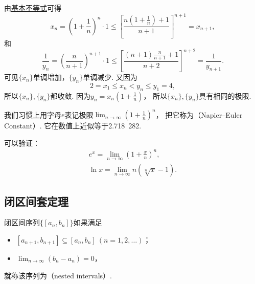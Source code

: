 由\hyperref[theorem:不等式.基本不等式n几何平均数与算术平均数]{基本不等式}可得\begin{equation*}
	x_n = \left(1+\frac1n\right)^n \cdot 1
	\leq \left[\frac{n\left(1+\frac1n\right)+1}{n+1}\right]^{n+1} = x_{n+1},
\end{equation*}
和\begin{equation*}
	\frac1{y_n} = \left(\frac{n}{n+1}\right)^{n+1} \cdot 1
	\leq \left[\frac{(n+1)\frac{n}{n+1}+1}{n+2}\right]^{n+2} = \frac1{y_{n+1}}.
\end{equation*}
可见\(\{x_n\}\)单调增加，\(\{y_n\}\)单调减少.
又因为\begin{equation*}
	2 = x_1 \leq x_n < y_n \leq y_1 = 4,
\end{equation*}
所以\(\{x_n\},\{y_n\}\)都收敛.
因为\(y_n=x_n\left(1+\frac1n\right)\)，
所以\(\{x_n\},\{y_n\}\)具有相同的极限.

我们习惯上用字母\(e\)表记极限\(\lim_{n\to\infty} \left(1+\frac1n\right)^n\)，
把它称为（Napier--Euler Constant）.
它在数值上近似等于{2.718~282}.

可以验证：\begin{gather}
	e^x = \lim_{n\to\infty} \left(1+\frac{x}{n}\right)^n,
	\label{equation:特殊函数.以e为底的指数函数} \\
	\ln x = \lim_{n\to\infty} n \left( \sqrt[n]{x} - 1 \right).
	\label{equation:特殊函数.以e为底的对数函数}
\end{gather}

\subsection{闭区间套定理}
\begin{definition}\label{definition:极限.闭区间套的定义}
闭区间序列\(\{[a_n,b_n]\}\)如果满足\begin{itemize}
	\item \([a_{n+1},b_{n+1}] \subseteq [a_n,b_n]\ (n=1,2,\dotsc)\)；
	\item \(\lim_{n\to\infty} (b_n - a_n) = 0\)，
\end{itemize}
就称该序列为（nested intervals）.
\end{definition}

